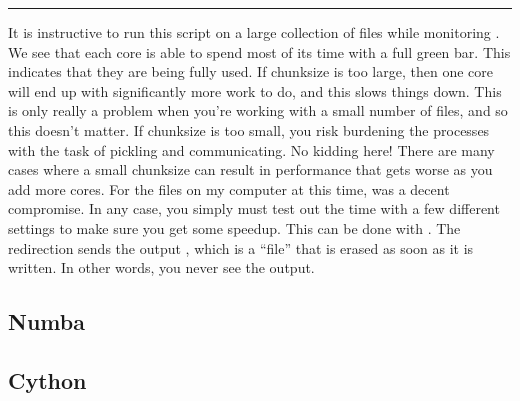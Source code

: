 \rule{\textwidth}{2pt}
It is instructive to run this script on a large collection of files while monitoring .  We see that each core is able to spend most of its time with a full green bar.  This indicates that they are being fully used.  If chunksize is too large, then one core will end up with significantly more work to do, and this slows things down.  This is only really a problem when you're working with a small number of files, and so this doesn't matter.  If chunksize is too small, you risk burdening the processes with the task of pickling and communicating.  No kidding here!  There are many cases where a small chunksize can result in performance that gets worse as you add more cores.  For the files on my computer at this time,  was a decent compromise.  In any case, you simply must test out the time with a few different settings to make sure you get some speedup.  This can be done with .  The redirection sends the output , which is a ``file'' that is erased as soon as it is written.  In other words, you never see the output.

\subsection{Numba}

\subsection{Cython}

